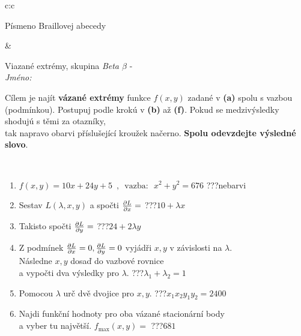 \documentclass[10pt]{report}
\begin{document}
\begin{tabular}{c:c}
\begin{minipage}[c][104.5mm][t]{0.5\linewidth}
\begin{center}
\begin{minipage}{0.20\linewidth}
\begin{center}
{\small Písmeno Braillovej abecedy}
\end{center}
\end{minipage}
\end{center}
\end{minipage}
&
\begin{minipage}[c][104.5mm][t]{0.5\linewidth}
\begin{center}
\vspace{7mm}
{\huge Viazané extrémy, skupina \textit{Beta $\beta$} -}\\[5mm]
\textit{Jméno:}\phantom{xxxxxxxxxxxxxxxxxxxxxxxxxxxxxxxxxxxxxxxxxxxxxxxxxxxxxxxxxxxxxxxxx}\\[5mm]
\begin{minipage}{0.95\linewidth}
\begin{center}
Cílem je najít \textbf{vázané extrémy} funkce $f(x,y)$ zadané v \textbf{(a)} spolu s vazbou (podmínkou). Postupuj podle krokú v \textbf{(b)} až \textbf{(f)}. Pokud se medzivýsledky shodujú s těmi za otazníky,\\tak napravo obarvi příslušející kroužek načerno. \textbf{Spolu odevzdejte výsledné slovo}.
\end{center}
\end{minipage}
\\[1mm]
\begin{minipage}{0.79\linewidth}
\begin{center}
\begin{varwidth}{\linewidth}
\begin{enumerate}
\normalsize
\item $f(x,y)=10x+24y+5 \enspace , \enspace \mathrm{vazba:} \enspace x^2+y^2=676$\quad \dotfill\; ???\;\dotfill \quad nebarvi
\item Sestav $L(\lambda,x,y)$ a spočti $\pdv{L}{x}=$\quad \dotfill\; ???\;\dotfill \quad $10+\lambda x$
\item Takisto spočti $\pdv{L}{y}=$\quad \dotfill\; ???\;\dotfill \quad $24+2\lambda y$
\item Z podmínek $\pdv{L}{x}=0 , \pdv{L}{y}=0$ vyjádři $x,y$ v závislosti na $\lambda$.\\ \phantom{xxxxxx}Následne $x,y$ dosaď do vazbové rovnice\\ \phantom{xxxxxx}a vypočti dva výsledky pro $\lambda$.\quad \dotfill\; ???\;\dotfill \quad $\lambda_1+\lambda_2=1$
\item Pomocou $\lambda$ urč dvě dvojice pro $x,y$.\quad \dotfill\; ???\;\dotfill \quad $x_1 x_2 y_1 y_2=2400$
\item Najdi funkční hodnoty pro oba vázané stacionární body\\ \phantom{xxxxxx}a vyber tu najvětší. $f_{\text{max}}(x,y)=$\quad \dotfill\; ???\;\dotfill \quad $681$

\end{enumerate}
\end{varwidth}
\end{center}
\end{minipage}
\end{center}
\end{minipage}
\end{tabular}
\end{document}
